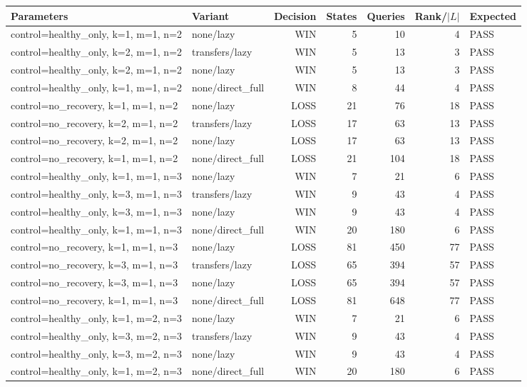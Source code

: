 \begin{longtable}{llrrrrl}
\toprule
Parameters & Variant & Decision & States & Queries & Rank/$|L|$ & Expected \\
\midrule
\endhead
control=healthy\_only, k=1, m=1, n=2 & none/lazy & WIN & 5 & 10 & 4 & PASS \\
control=healthy\_only, k=2, m=1, n=2 & transfers/lazy & WIN & 5 & 13 & 3 & PASS \\
control=healthy\_only, k=2, m=1, n=2 & none/lazy & WIN & 5 & 13 & 3 & PASS \\
control=healthy\_only, k=1, m=1, n=2 & none/direct\_full & WIN & 8 & 44 & 4 & PASS \\
control=no\_recovery, k=1, m=1, n=2 & none/lazy & LOSS & 21 & 76 & 18 & PASS \\
control=no\_recovery, k=2, m=1, n=2 & transfers/lazy & LOSS & 17 & 63 & 13 & PASS \\
control=no\_recovery, k=2, m=1, n=2 & none/lazy & LOSS & 17 & 63 & 13 & PASS \\
control=no\_recovery, k=1, m=1, n=2 & none/direct\_full & LOSS & 21 & 104 & 18 & PASS \\
control=healthy\_only, k=1, m=1, n=3 & none/lazy & WIN & 7 & 21 & 6 & PASS \\
control=healthy\_only, k=3, m=1, n=3 & transfers/lazy & WIN & 9 & 43 & 4 & PASS \\
control=healthy\_only, k=3, m=1, n=3 & none/lazy & WIN & 9 & 43 & 4 & PASS \\
control=healthy\_only, k=1, m=1, n=3 & none/direct\_full & WIN & 20 & 180 & 6 & PASS \\
control=no\_recovery, k=1, m=1, n=3 & none/lazy & LOSS & 81 & 450 & 77 & PASS \\
control=no\_recovery, k=3, m=1, n=3 & transfers/lazy & LOSS & 65 & 394 & 57 & PASS \\
control=no\_recovery, k=3, m=1, n=3 & none/lazy & LOSS & 65 & 394 & 57 & PASS \\
control=no\_recovery, k=1, m=1, n=3 & none/direct\_full & LOSS & 81 & 648 & 77 & PASS \\
control=healthy\_only, k=1, m=2, n=3 & none/lazy & WIN & 7 & 21 & 6 & PASS \\
control=healthy\_only, k=3, m=2, n=3 & transfers/lazy & WIN & 9 & 43 & 4 & PASS \\
control=healthy\_only, k=3, m=2, n=3 & none/lazy & WIN & 9 & 43 & 4 & PASS \\
control=healthy\_only, k=1, m=2, n=3 & none/direct\_full & WIN & 20 & 180 & 6 & PASS \\

\end{longtable}
